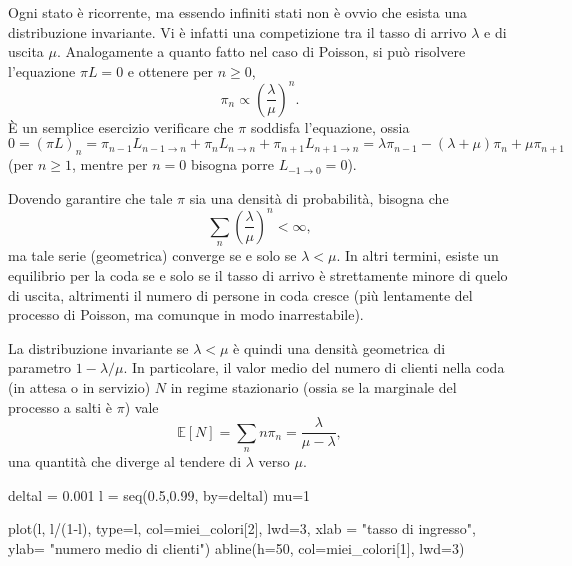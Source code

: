 \documentclass[
  italian,
  letterpaper,
]{book}
\newenvironment{Shaded}{\begin{snugshade}}{\end{snugshade}}
\newcommand{\AttributeTok}[1]{\textcolor[rgb]{0.40,0.45,0.13}{#1}}
\newcommand{\DecValTok}[1]{\textcolor[rgb]{0.68,0.00,0.00}{#1}}
\newcommand{\FloatTok}[1]{\textcolor[rgb]{0.68,0.00,0.00}{#1}}
\newcommand{\FunctionTok}[1]{\textcolor[rgb]{0.28,0.35,0.67}{#1}}
\newcommand{\NormalTok}[1]{\textcolor[rgb]{0.00,0.23,0.31}{#1}}
\newcommand{\OtherTok}[1]{\textcolor[rgb]{0.00,0.23,0.31}{#1}}
\newcommand{\SpecialCharTok}[1]{\textcolor[rgb]{0.37,0.37,0.37}{#1}}
\newcommand{\StringTok}[1]{\textcolor[rgb]{0.13,0.47,0.30}{#1}}
\newcommand{\bra}[1]{\left( #1 \right)}
\newcommand{\sqa}[1]{\left[ #1 \right]}
\newcommand{\E}[1]{\mathbb{E}\sqa{#1}}
\theoremstyle{definition}
\theoremstyle{remark}
\begin{document}
Ogni stato è ricorrente, ma essendo infiniti stati non è ovvio che
esista una distribuzione invariante. Vi è infatti una competizione tra
il tasso di arrivo \(\lambda\) e di uscita \(\mu\). Analogamente a
quanto fatto nel caso di Poisson, si può risolvere l'equazione
\(\pi L = 0\) e ottenere per \(n \ge 0\),
\[\pi_n \propto \bra{ \frac{\lambda}{\mu}}^n.\] È un semplice esercizio
verificare che \(\pi\) soddisfa l'equazione, ossia
\[ 0 = (\pi L)_n = \pi_{n-1} L_{n-1 \to n} + \pi_n L_{n\to n} +\pi_{n+1}L_{n+1\to n} = \lambda \pi_{n-1} -(\lambda+\mu) \pi_n + \mu \pi_{n+1}\]
(per \(n \ge 1\), mentre per \(n=0\) bisogna porre
\(L_{-1 \to 0} = 0\)).

Dovendo garantire che tale \(\pi\) sia una densità di probabilità,
bisogna che \[\sum_{n} \bra{ \frac\lambda \mu}^n < \infty,\] ma tale
serie (geometrica) converge se e solo se \(\lambda<\mu\). In altri
termini, esiste un equilibrio per la coda se e solo se il tasso di
arrivo è strettamente minore di quelo di uscita, altrimenti il numero di
persone in coda cresce (più lentamente del processo di Poisson, ma
comunque in modo inarrestabile).

La distribuzione invariante se \(\lambda<\mu\) è quindi una densità
geometrica di parametro \(1-\lambda/\mu\). In particolare, il valor
medio del numero di clienti nella coda (in attesa o in servizio) \(N\)
in regime stazionario (ossia se la marginale del processo a salti è
\(\pi\)) vale
\[ \E{N} = \sum_{n} n \pi_n = \frac{\lambda}{\mu -\lambda},\] una
quantità che diverge al tendere di \(\lambda\) verso \(\mu\).

\begin{Shaded}
\begin{Highlighting}[]
\NormalTok{deltal }\OtherTok{=} \FloatTok{0.001}
\NormalTok{l }\OtherTok{=} \FunctionTok{seq}\NormalTok{(}\FloatTok{0.5}\NormalTok{,}\FloatTok{0.99}\NormalTok{, }\AttributeTok{by=}\NormalTok{deltal)}
\NormalTok{mu}\OtherTok{=}\DecValTok{1}

\FunctionTok{plot}\NormalTok{(l, l}\SpecialCharTok{/}\NormalTok{(}\DecValTok{1}\SpecialCharTok{{-}}\NormalTok{l), }\AttributeTok{type=}\StringTok{\textquotesingle{}l\textquotesingle{}}\NormalTok{, }\AttributeTok{col=}\NormalTok{miei\_colori[}\DecValTok{2}\NormalTok{], }\AttributeTok{lwd=}\DecValTok{3}\NormalTok{, }\AttributeTok{xlab =} \StringTok{"tasso di ingresso"}\NormalTok{, }\AttributeTok{ylab=} \StringTok{"numero medio di clienti"}\NormalTok{)}
\FunctionTok{abline}\NormalTok{(}\AttributeTok{h=}\DecValTok{50}\NormalTok{, }\AttributeTok{col=}\NormalTok{miei\_colori[}\DecValTok{1}\NormalTok{], }\AttributeTok{lwd=}\DecValTok{3}\NormalTok{)}
\end{Highlighting}
\end{Shaded}
\end{document}
